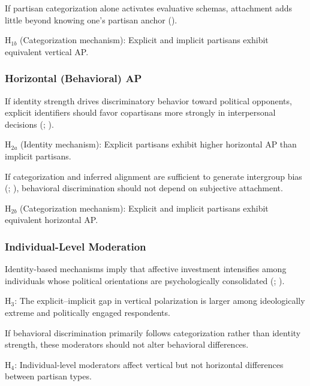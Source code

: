\documentclass[
  12pt,
  a4paper,
  DIV=11,
  numbers=noendperiod]{scrartcl}
\begin{document}
If partisan categorization alone activates evaluative schemas,
attachment adds little beyond knowing one's partisan anchor
().

\(\text{H}_{1b}\) (Categorization mechanism): Explicit and implicit
partisans exhibit equivalent vertical AP.

\subsubsection{Horizontal (Behavioral)
AP}\label{horizontal-behavioral-ap}

If identity strength drives discriminatory behavior toward political
opponents, explicit identifiers should favor copartisans more strongly
in interpersonal decisions (; ).

\(\text{H}_{2a}\) (Identity mechanism): Explicit partisans exhibit
higher horizontal AP than implicit partisans.

If categorization and inferred alignment are sufficient to generate
intergroup bias (; ),
behavioral discrimination should not depend on subjective attachment.

\(\text{H}_{2b}\) (Categorization mechanism): Explicit and implicit
partisans exhibit equivalent horizontal AP.

\subsubsection{Individual-Level
Moderation}\label{individual-level-moderation}

Identity-based mechanisms imply that affective investment intensifies
among individuals whose political orientations are psychologically
consolidated (;
).

\(\text{H}_3\): The explicit--implicit gap in vertical polarization is
larger among ideologically extreme and politically engaged respondents.

If behavioral discrimination primarily follows categorization rather
than identity strength, these moderators should not alter behavioral
differences.

\(\text{H}_4\): Individual-level moderators affect vertical but not
horizontal differences between partisan types.
\end{document}
